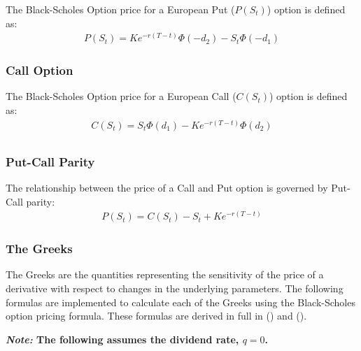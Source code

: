 \documentclass[10pt]{article}
\begin{document}
        The Black-Scholes Option price for a European Put ($P(S_t)$) option is defined as:
        \begin{gather*}
            P(S_t) = K e^{-r(T-t)} \Phi(-d_2) - S_t \Phi(-d_1)
        \end{gather*}

        


        \subsubsection{Call Option}

        The Black-Scholes Option price for a European Call ($C(S_t)$) option is defined as:
        \begin{gather*}
            C(S_t) = S_t \Phi(d_1) - K e^{-r(T-t)} \Phi(d_2) \\
        \end{gather*}

        


        \subsubsection{Put-Call Parity}

        The relationship between the price of a Call and Put option is governed by Put-Call parity:
        \begin{gather*}
            P(S_t) = C(S_t) - S_t + K e^{-r(T-t)}
        \end{gather*}
    
        


        \subsubsection{The Greeks}

        The Greeks are the quantities representing the sensitivity of the price of a derivative with respect to changes in the underlying parameters. The following formulas are implemented to calculate each of the Greeks using the Black-Scholes option pricing formula. These formulas are derived in full in (\cite{Stefanica2011}) and (\cite{Weerawarana2016}).

        \begin{center}
            \textbf{\textit{Note:} The following assumes the dividend rate, $q = 0$.}
        \end{center}
    
\end{document}
